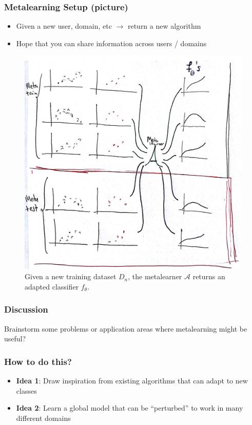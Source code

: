 \documentclass[10pt,mathserif]{beamer}
\begin{document}
\begin{frame}
  \frametitle{Metalearning Setup (picture)}
  \begin{itemize}
  \item Given a new user, domain, etc $\rightarrow$ return a new algorithm
  \item Hope that you can share information across users / domains
  \end{itemize}
  \begin{figure}[ht]
    \centering
    \includegraphics[width=0.45\paperwidth]{figure/metalearning_setup_curves}
    \caption{Given a new training dataset $D_n$, the metalearner $\mathcal{A}$
      returns an adapted classifier
      $f_{\theta}$. \label{fig:metalearning_setup_boxes}}
  \end{figure}
\end{frame}

\begin{frame}
  \frametitle{Discussion}
  Brainstorm some problems or application areas where metalearning might
  be useful?
\end{frame}

\begin{frame}
  \frametitle{How to do this?}
  \begin{itemize}
  \item \textbf{Idea 1}: Draw inspiration from existing algorithms that can
    adapt to new classes
  \item \textbf{Idea 2}: Learn a global model that can be ``perturbed'' to work
    in many different domains
  \end{itemize}
\end{frame}
\end{document}

